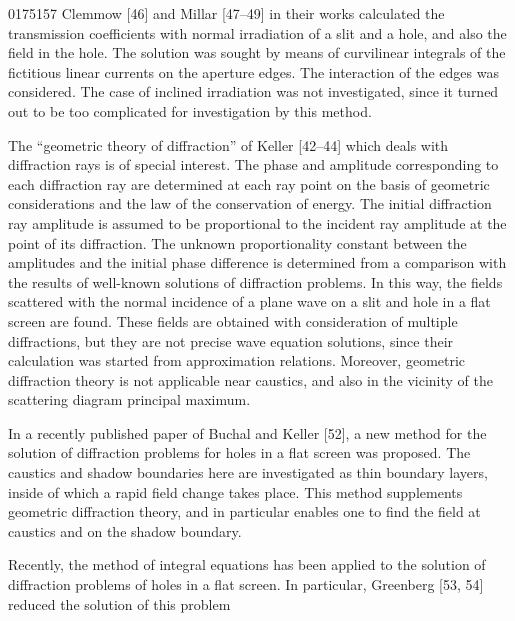\begin{scanpage}{0175}{157}
Clemmow [46] and Millar [47--49] in their works calculated the transmission coefficients with normal irradiation of a slit and a hole, and also the field in the hole. The solution was sought by means of curvilinear integrals of the fictitious linear currents on the aperture edges. The interaction of the edges was considered. The case of inclined irradiation was not investigated, since it turned out to be too complicated for investigation by this method.

The ``geometric theory of diffraction'' of Keller [42--44] which deals with diffraction rays is of special interest. The phase and amplitude corresponding to each diffraction ray are determined at each ray point on the basis of geometric considerations and the law of the conservation of energy. The initial diffraction ray amplitude is assumed to be proportional to the incident ray amplitude at the point of its diffraction. The unknown proportionality constant between the amplitudes and the initial phase difference is determined from a comparison with the results of well-known solutions of diffraction problems. In this way, the fields scattered with the normal incidence of a plane wave on a slit and hole in a flat screen are found. These fields are obtained with consideration of multiple diffractions, but they are not precise wave equation solutions, since their calculation was started from approximation relations. Moreover, geometric diffraction theory is not applicable near caustics, and also in the vicinity of the scattering diagram principal maximum.

In a recently published paper of Buchal and Keller [52], a new method for the solution of diffraction problems for holes in a flat screen was proposed. The caustics and shadow boundaries here are investigated as thin boundary layers, inside of which a rapid field change takes place. This method supplements geometric diffraction theory, and in particular enables one to find the field at caustics and on the shadow boundary.

Recently, the method of integral equations has been applied to the solution of diffraction problems of holes in a flat screen. In particular, Greenberg [53, 54] reduced the solution of this problem
\end{scanpage}
